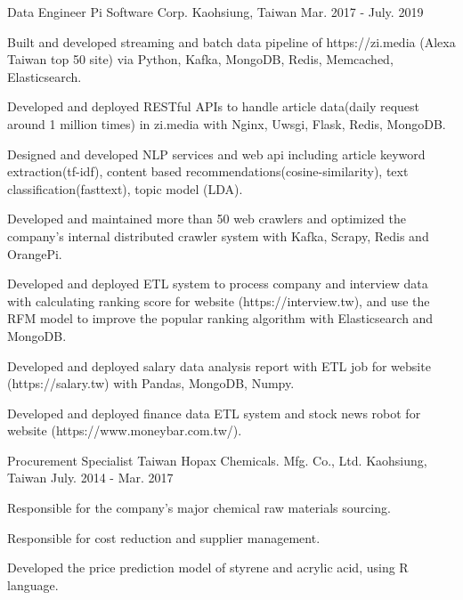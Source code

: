 \begin{cventries}
  \cventry
    {Data Engineer} %
    {Pi Software Corp.} %
    {Kaohsiung, Taiwan} %
    {Mar. 2017 - July. 2019} %
    {
      \begin{cvitems} %
        \item {Built and developed streaming and batch data pipeline of https://zi.media (Alexa Taiwan top 50 site) via Python, Kafka, MongoDB, Redis, Memcached, Elasticsearch.}
        \item {Developed and deployed RESTful APIs to handle article data(daily request around 1 million times) in zi.media with Nginx, Uwsgi, Flask, Redis, MongoDB.}
        \item {Designed and developed NLP services and web api including article keyword extraction(tf-idf), content based recommendations(cosine-similarity), text classification(fasttext), topic model (LDA).}
        \item {Developed and maintained more than 50 web crawlers and optimized the company’s internal distributed crawler system with Kafka, Scrapy, Redis and OrangePi.}
        \item {Developed and deployed ETL system to process company and interview data with calculating ranking score for website (https://interview.tw), and use the RFM model to improve the popular ranking algorithm with Elasticsearch and MongoDB.}
        \item {Developed and deployed salary data analysis report with ETL job for website (https://salary.tw) with Pandas, MongoDB, Numpy.}
        \item {Developed and deployed finance data ETL system and stock news robot for website (https://www.moneybar.com.tw/).}
      \end{cvitems}
    }

  \cventry
    {Procurement Specialist} %
    {Taiwan Hopax Chemicals. Mfg. Co., Ltd.} %
    {Kaohsiung, Taiwan} %
    {July. 2014 - Mar. 2017} %
    {
      \begin{cvitems} %
        \item {Responsible for the company's major chemical raw materials sourcing.}
        \item {Responsible for cost reduction and supplier management.}
        \item {Developed the price prediction model of styrene and acrylic acid, using R language.}
      \end{cvitems}
    }


\end{cventries}
